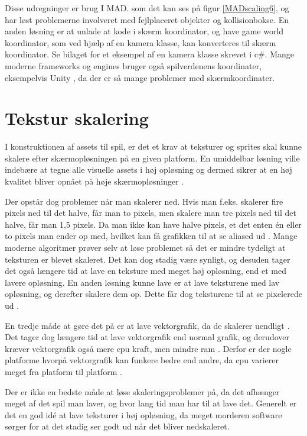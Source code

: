 \documentclass[Main.tex]{PositionOgSkalering}
\begin{document}
Disse udregninger er brug I MAD. som det kan ses på figur \ref{MADscaling6}, og har løst problemerne involveret med fejlplaceret objekter og kollisionbokse.
En anden løsning er at unlade at kode i skærm koordinator, og have game world koordinator, som ved hjælp af en kamera klasse, kan konverteres til skærm koordinator. Se bilaget for et eksempel af en kamera klasse skrevet i c\#.
Mange moderne frameworks og engines bruger også spilverdenens koordinater, eksempelvis Unity \cite{unity3d}, da der er så mange problemer med skærmkoordinater.

\section{Tekstur skalering}
I konstruktionen af assets til spil, er det et krav at teksturer og sprites skal kunne skalere efter skærmopløsningen på en given platform. En umiddelbar løsning ville indebære at tegne alle visuelle assets i høj opløsning og dermed sikrer at en høj kvalitet bliver opnået på høje skærmopløsninger \cite{deepworldgame}.

Der opstår dog problemer når man skalerer ned. Hvis man f.eks. skalerer fire pixels ned til det halve, får man to pixels, men skalere man tre pixels ned til det halve, får man 1,5 pixels. Da man ikke kan have halve pixels, et det enten én eller to pixels man ender op med, hvilket kan få grafikken til at se aliased ud \cite{Martin}. Mange moderne algoritmer prøver selv at løse problemet så det er mindre tydeligt at teksturen er blevet skaleret.\cite{Kopf} Det kan dog stadig være synligt, og desuden tager det også længere tid at lave en teksture med meget høj opløsning, end et med lavere opløsning. En anden løsning  kunne lave er at lave teksturene med lav opløsning, og derefter skalere dem op. Dette får dog teksturene til at se pixelerede ud \cite{McHugh}.

En tredje måde at gøre det på er at lave vektorgrafik, da de skalerer uendligt \cite{deepworldgame}. Det tager dog længere tid at lave vektorgrafik end normal grafik,\cite{deepworldgame} og derudover kræver vektorgrafik også mere cpu kraft, men mindre ram \cite{deepworldgame}. Derfor er der nogle platforme hvorpå vektorgrafik kan funkere bedre end andre, da cpu varierer meget fra platform til platform \cite{PassMark}.

Der er ikke en bedste måde at løse skaleringsproblemer på, da det afhænger meget af det spil man laver, og hvor lang tid man har til at lave det. Generelt er det en god idé at lave teksturer i høj opløsning, da meget morderen software sørger for at det stadig ser godt ud når det bliver nedskaleret.
\end{document}
